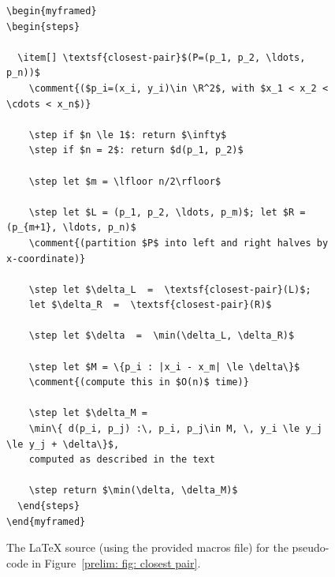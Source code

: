 \begin{figure}
\begin{myframed}\small
\begin{verbatim}
\begin{myframed}
\begin{steps}

  \item[] \textsf{closest-pair}$(P=(p_1, p_2, \ldots, p_n))$
    \comment{($p_i=(x_i, y_i)\in \R^2$, with $x_1 < x_2 < \cdots < x_n$)}

    \step if $n \le 1$: return $\infty$
    \step if $n = 2$: return $d(p_1, p_2)$

    \step let $m = \lfloor n/2\rfloor$

    \step let $L = (p_1, p_2, \ldots, p_m)$; let $R = (p_{m+1}, \ldots, p_n)$
    \comment{(partition $P$ into left and right halves by x-coordinate)}

    \step let $\delta_L  =  \textsf{closest-pair}(L)$; 
    let $\delta_R  =  \textsf{closest-pair}(R)$

    \step let $\delta  =  \min(\delta_L, \delta_R)$

    \step let $M = \{p_i : |x_i - x_m| \le \delta\}$
    \comment{(compute this in $O(n)$ time)}

    \step let $\delta_M = 
    \min\{ d(p_i, p_j) :\, p_i, p_j\in M, \, y_i \le y_j \le y_j + \delta\}$,
    computed as described in the text

    \step return $\min(\delta, \delta_M)$
  \end{steps}
\end{myframed}
\end{verbatim}
  \end{myframed}
  \caption{The LaTeX source (using the provided macros file)
    for the pseudo-code in Figure~\ref{prelim: fig: closest pair}.}\label{latex: fig: closest pair source}
\end{figure}

